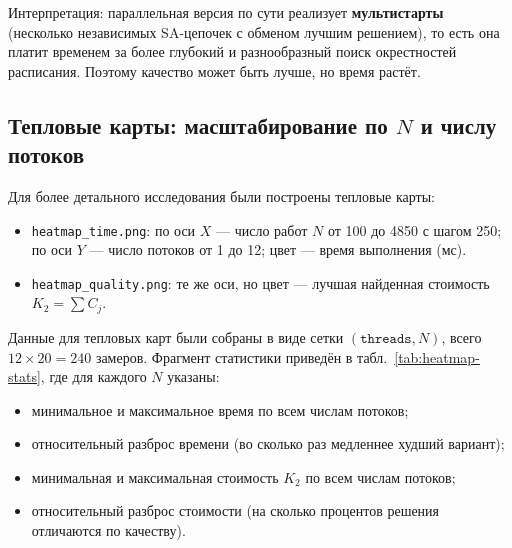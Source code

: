 \documentclass[a4paper,12pt]{article}
\begin{document}
Интерпретация: параллельная версия по сути реализует \textbf{мультистарты} (несколько независимых SA-цепочек с обменом лучшим решением), то есть она платит временем за более глубокий и разнообразный поиск окрестностей расписания. Поэтому качество может быть лучше, но время растёт.

\subsection{Тепловые карты: масштабирование по $N$ и числу потоков}

Для более детального исследования были построены тепловые карты:
\begin{itemize}
    \item \texttt{heatmap\_time.png}: по оси $X$ --- число работ $N$ от 100 до 4850 с шагом 250; по оси $Y$ --- число потоков от 1 до 12; цвет --- время выполнения (мс).
    \item \texttt{heatmap\_quality.png}: те же оси, но цвет --- лучшая найденная стоимость $K_2 = \sum C_j$.
\end{itemize}

Данные для тепловых карт были собраны в виде сетки $(\texttt{threads}, N)$, всего $12 \times 20 = 240$ замеров. Фрагмент статистики приведён в табл.~\ref{tab:heatmap-stats}, где для каждого $N$ указаны:
\begin{itemize}
    \item минимальное и максимальное время по всем числам потоков;
    \item относительный разброс времени (во сколько раз медленнее худший вариант);
    \item минимальная и максимальная стоимость $K_2$ по всем числам потоков;
    \item относительный разброс стоимости (на сколько процентов решения отличаются по качеству).
\end{itemize}
\end{document}
